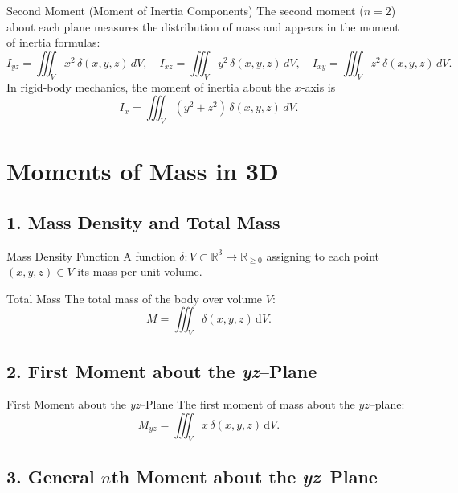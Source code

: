 \begin{define}{Second Moment (Moment of Inertia Components)}
  The second moment ($n=2$) about each plane measures the distribution of mass and appears in the moment of inertia formulas:
  \[
    I_{yz}=\iiint_V x^2\,\delta(x,y,z)\,dV,
    \quad
    I_{xz}=\iiint_V y^2\,\delta(x,y,z)\,dV,
    \quad
    I_{xy}=\iiint_V z^2\,\delta(x,y,z)\,dV.
  \]
  In rigid‑body mechanics, the moment of inertia about the $x$‑axis is
  \[
    I_x = \iiint_V (y^2+z^2)\,\delta(x,y,z)\,dV.
  \]
\end{define}


\newpage




\section*{Moments of Mass in 3D}

\subsection*{1. Mass Density and Total Mass}

\begin{define}{Mass Density Function}
  A function $\delta:V\subset\mathbb{R}^3\to\mathbb{R}_{\ge0}$ assigning to each point $(x,y,z)\in V$ its mass per unit volume.
\end{define}

\begin{define}{Total Mass}
  The total mass of the body over volume $V$:
  \[
    M = \iiint_V \delta(x,y,z)\,\mathrm{d}V.
  \]
\end{define}

\subsection*{2. First Moment about the \emph{yz}–Plane}

\begin{define}{First Moment about the \emph{yz}–Plane}
  The first moment of mass about the $yz$–plane:
  \[
    M_{yz} = \iiint_V x\,\delta(x,y,z)\,\mathrm{d}V.
  \]
\end{define}

\subsection*{3. General $n$th Moment about the \emph{yz}–Plane}

